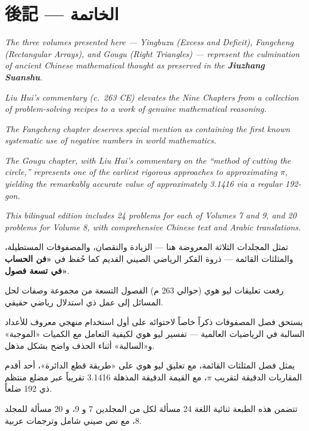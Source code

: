 \documentclass[11pt,a4paper]{article}
\newcommand{\ar}[1]{\arabicfont\beginR #1\endR}
\newcommand{\ChinCol}[1]{\begin{minipage}[t]{0.48\textwidth}#1\end{minipage}}
\newcommand{\ArabCol}[1]{\begin{minipage}[t]{0.48\textwidth}\arabicfont\beginR #1\endR\end{minipage}}
\newcommand{\parallelsection}[2]{%
  \noindent\ChinCol{#1}\hfill\ArabCol{#2}\par\vspace{0.5cm}%
}
\begin{document}
\newpage

\section*{後記 --- \ar{الخاتمة}}

\parallelsection{%
\textit{The three volumes presented here --- Yingbuzu (Excess and Deficit), Fangcheng (Rectangular Arrays), and Gougu (Right Triangles) --- represent the culmination of ancient Chinese mathematical thought as preserved in the \textbf{Jiuzhang Suanshu}.}

\textit{Liu Hui's commentary (c.~263 CE) elevates the Nine Chapters from a collection of problem-solving recipes to a work of genuine mathematical reasoning.}

\textit{The Fangcheng chapter deserves special mention as containing the first known systematic use of negative numbers in world mathematics.}

\textit{The Gougu chapter, with Liu Hui's commentary on the ``method of cutting the circle,'' represents one of the earliest rigorous approaches to approximating $\pi$, yielding the remarkably accurate value of approximately 3.1416 via a regular 192-gon.}

\textit{This bilingual edition includes 24 problems for each of Volumes 7 and 9, and 20 problems for Volume 8, with comprehensive Chinese text and Arabic translations.}
}{%
تمثل المجلدات الثلاثة المعروضة هنا --- الزيادة والنقصان، والمصفوفات المستطيلة، والمثلثات القائمة --- ذروة الفكر الرياضي الصيني القديم كما حُفظ في \textbf{«فن الحساب في تسعة فصول»}.

رفعت تعليقات ليو هوي (حوالي 263 م) الفصول التسعة من مجموعة وصفات لحل المسائل إلى عمل ذي استدلال رياضي حقيقي.

يستحق فصل المصفوفات ذكراً خاصاً لاحتوائه على أول استخدام منهجي معروف للأعداد السالبة في الرياضيات العالمية --- تفسير ليو هوي لكيفية التعامل مع الكميات «الموجبة» و«السالبة» أثناء الحذف واضح بشكل مذهل.

يمثل فصل المثلثات القائمة، مع تعليق ليو هوي على «طريقة قطع الدائرة»، أحد أقدم المقاربات الدقيقة لتقريب $\pi$، مع القيمة الدقيقة المذهلة 3.1416 تقريباً عبر مضلع منتظم ذي 192 ضلعاً.

تتضمن هذه الطبعة ثنائية اللغة 24 مسألة لكل من المجلدين 7 و 9، و 20 مسألة للمجلد 8، مع نص صيني شامل وترجمات عربية.
}
\end{document}
